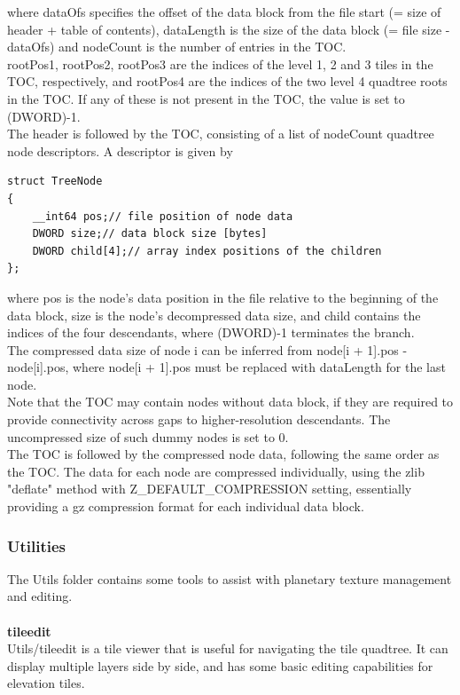 \documentclass[Orbiter Developer Manual.tex]{subfiles}
\begin{document}
\noindent
where dataOfs specifies the offset of the data block from the file start (= size of header + table of contents), dataLength is the size of the data block (= file size - dataOfs) and nodeCount is the number of entries in the TOC.\\
rootPos1, rootPos2, rootPos3 are the indices of the level 1, 2 and 3 tiles in the TOC, respectively, and rootPos4 are the indices of the two level 4 quadtree roots in the TOC. If any of these is not present in the TOC, the value is set to (DWORD)-1.\\
The header is followed by the TOC, consisting of a list of nodeCount quadtree node descriptors. A descriptor is given by

\begin{lstlisting}
struct TreeNode
{
	__int64 pos;// file position of node data
	DWORD size;// data block size [bytes]
	DWORD child[4];// array index positions of the children
};
\end{lstlisting}

\noindent
where pos is the node's data position in the file relative to the beginning of the data block, size is the node's decompressed data size, and child contains the indices of the four descendants, where (DWORD)-1 terminates the branch.\\
The compressed data size of node i can be inferred from node[i + 1].pos - node[i].pos, where node[i + 1].pos must be replaced with dataLength for the last node.\\
Note that the TOC may contain nodes without data block, if they are required to provide connectivity across gaps to higher-resolution descendants. The uncompressed size of such dummy nodes is set to 0.\\
The TOC is followed by the compressed node data, following the same order as the TOC. The data for each node are compressed individually, using the zlib "deflate" method with Z\_DEFAULT\_COMPRESSION setting, essentially providing a gz compression format for each individual data block.


\subsubsection{Utilities}
The Utils folder contains some tools to assist with planetary texture management and editing.\\
\\
\textbf{tileedit}\\
Utils/tileedit is a tile viewer that is useful for navigating the tile quadtree. It can display multiple layers side by side, and has some basic editing capabilities for elevation tiles.
\end{document}
